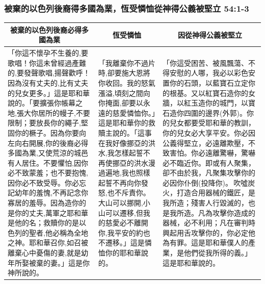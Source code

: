 \subsubsection{被棄的以色列後裔得多國為業，恆受憐恤從神得公義被堅立 54:1-3}
\begin{table}[H]
\centering
\begin{tabular}{p{6.5cm}|p{}|p{6.750cm}}\hline\hline
\multicolumn{1}{c|}{被棄的以色列後裔必得多國為業}&\multicolumn{1}{c|}{恆受憐恤}&\multicolumn{1}{c}{因從神得公義被堅立}\\\hline
「你這不懷孕不生養的,要歌唱！你這未曾經過產難的,要發聲歌唱,揚聲歡呼！因為沒有丈夫的,比有丈夫的兒女更多。」這是耶和華說的。「要擴張你帳幕之地,張大你居所的幔子,不要限制；要放長你的繩子,堅固你的橛子。因為你要向左向右開展,你的後裔必得多國為業,又使荒涼的城邑有人居住。不要懼怕,因你必不致蒙羞；也不要抱愧,因你必不致受辱。你必忘記幼年的羞愧,不再記念你寡居的羞辱。因為造你的是你的丈夫,萬軍之耶和華是他的名；救贖你的是以色列的聖者,他必稱為全地之神。耶和華召你,如召被離棄心中憂傷的妻,就是幼年所娶被棄的妻。」這是你神所說的。
&「我離棄你不過片時,卻要施大恩將你收回。我的怒氣漲溢,頃刻之間向你掩面,卻要以永遠的慈愛憐恤你。」這是耶和華你的救贖主說的。「這事在我好像挪亞的洪水,我怎樣起誓不再使挪亞的洪水漫過遍地,我也照樣起誓不再向你發怒,也不斥責你。大山可以挪開,小山可以遷移,但我的慈愛必不離開你,我平安的約也不遷移。」這是憐恤你的耶和華說的。
&「你這受困苦、被風飄蕩、不得安慰的人哪，我必以彩色安置你的石頭，以藍寶石立定你的根基。又以紅寶石造你的女牆，以紅玉造你的城門，以寶石造你四圍的邊界(外郭)。你的兒女都要受耶和華的教訓，你的兒女必大享平安。你必因公義得堅立，必遠離欺壓，不致害怕。你必遠離驚嚇，驚嚇必不臨近你。即或有人聚集，卻不由於我，凡聚集攻擊你的必因你仆倒(投降你)。 吹噓炭火，打造合用器械的鐵匠，是我所造；殘害人行毀滅的，也是我所造。凡為攻擊你造成的器械，必不利用；凡在審判時興起用舌攻擊你的，你必定他為有罪。這是耶和華僕人的產業，是他們從我所得的義。」這是耶和華說的。\\\hline
\end{tabular}
\end{table}


